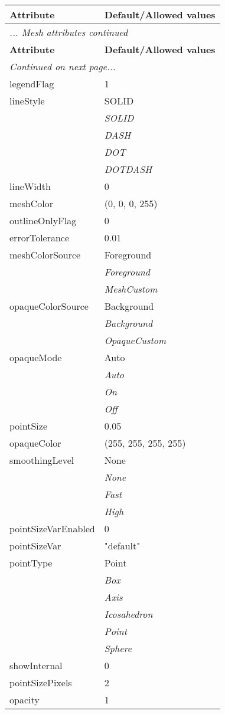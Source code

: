 \documentclass[10pt,a4paper]{report}
\begin{document}
\begin{longtable}{ll}
{\bf Attribute} & {\bf Default/Allowed values} \\
\hline \hline
\endfirsthead
\multicolumn{2}{l}{{\it ... Mesh attributes continued}} \\
{\bf Attribute} & {\bf Default/Allowed values} \\
\hline \hline
\endhead
\hline
\multicolumn{2}{l}{{\it Continued on next page...}} \\
\endfoot
\hline
\endlastfoot

legendFlag  &  1 \\
lineStyle  &  SOLID   \\
 & {\it  SOLID} \\
 & {\it  DASH} \\
 & {\it  DOT} \\
 & {\it  DOTDASH} \\
lineWidth  &  0 \\
meshColor  &  (0, 0, 0, 255) \\
outlineOnlyFlag  &  0 \\
errorTolerance  &  0.01 \\
meshColorSource  &  Foreground   \\
 & {\it  Foreground} \\
 & {\it  MeshCustom} \\
opaqueColorSource  &  Background   \\
 & {\it  Background} \\
 & {\it  OpaqueCustom} \\
opaqueMode  &  Auto   \\
 & {\it  Auto} \\
 & {\it  On} \\
 & {\it  Off} \\
pointSize  &  0.05 \\
opaqueColor  &  (255, 255, 255, 255) \\
smoothingLevel  &  None   \\
 & {\it  None} \\
 & {\it  Fast} \\
 & {\it  High} \\
pointSizeVarEnabled  &  0 \\
pointSizeVar  &  "default" \\
pointType  &  Point   \\
 & {\it  Box} \\
 & {\it  Axis} \\
 & {\it  Icosahedron} \\
 & {\it  Point} \\
 & {\it  Sphere} \\
showInternal  &  0 \\
pointSizePixels  &  2 \\
opacity  &  1 \\
\end{longtable}
\end{document}

